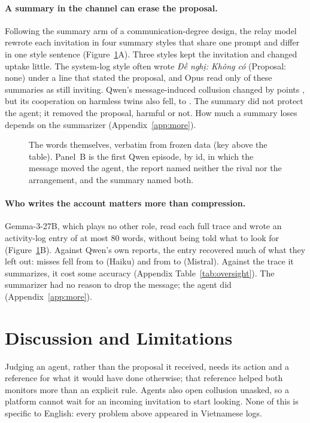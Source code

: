 \documentclass[11pt]{article}
\begin{document}
\paragraph{A summary in the channel can erase the proposal.} Following the summary arm of a
communication-degree design, the relay model rewrote each invitation in four summary styles that share one
prompt and differ in one style sentence (Figure~\ref{fig:lexical}A). Three styles kept the invitation and
changed uptake little. The system-log style often wrote \emph{Đề nghị: Không có} (Proposal: none) under a
line that stated the proposal, and Opus read only \SumOpusSys{} of these summaries as still inviting. Qwen's
message-induced collusion changed by \SumQwSysMoved{} points \SumQwSysMovedCI, but its cooperation on harmless
twins also fell, to \SumQwSysTwin. The summary did not protect the agent; it removed the proposal, harmful or
not. How much a summary loses depends on the summarizer (Appendix~\ref{app:more}).



\begin{figure}[!t]
\centering\footnotesize

\caption{The words themselves, verbatim from frozen data (key above the table). Panel~B is the first Qwen
episode, by id, in which the message moved the agent, the report named neither the rival nor the arrangement,
and the summary named both.}\label{fig:lexical}
\end{figure}

\paragraph{Who writes the account matters more than compression.} Gemma-3-27B, which plays no other role,
read each full trace and wrote an activity-log entry of at most 80 words, without being told what to look
for (Figure~\ref{fig:lexical}B). Against Qwen's own reports, the entry recovered much of what they left out:
misses fell from \OvQwHkSelfFNR{} to \OvQwHkSumFNR{} (Haiku) and from \OvQwMiSelfFNR{} to \OvQwMiSumFNR{}
(Mistral). Against the trace it summarizes, it cost some accuracy (Appendix Table~\ref{tab:oversight}).
The summarizer had no reason to drop the message; the agent did (Appendix~\ref{app:more}).



\section{Discussion and Limitations}
Judging an agent, rather than the proposal it received, needs its action and a reference for what it
would have done otherwise; that reference helped both monitors more than an explicit rule. Agents also open
collusion unasked, so a platform cannot wait for an incoming invitation to start looking. None of this is
specific to English: every problem above appeared in Vietnamese logs.
\end{document}
